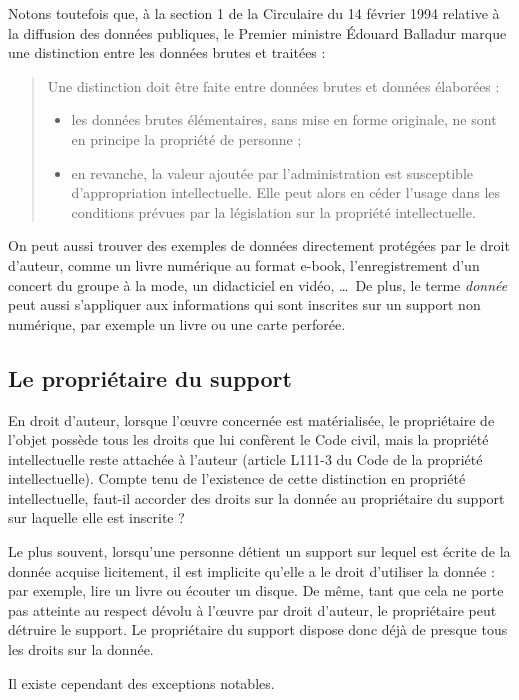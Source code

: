 Notons toutefois que, à la section 1 de la Circulaire du 14 février
1994 relative à la diffusion des données publiques, le Premier
ministre Édouard Balladur marque une distinction entre les données
brutes et traitées :

\begin{quotation}
  Une distinction doit être faite entre données brutes et données
  élaborées :
  \begin{itemize}
  \item les données brutes élémentaires, sans mise en forme
    originale, ne sont en principe la propriété de personne ;
  \item en revanche, la valeur ajoutée par l'administration est
    susceptible d'appropriation intellectuelle. Elle peut alors en
    céder l'usage dans les conditions prévues par la législation sur
    la propriété intellectuelle.
  \end{itemize}
\end{quotation}

On peut aussi trouver des exemples de données directement protégées
par le droit d'auteur, comme un livre numérique au format e-book,
l'enregistrement d'un concert du groupe à la mode, un didacticiel en
vidéo, \dots\ De plus, le terme \emph{donnée} peut aussi s'appliquer
aux informations qui sont inscrites sur un support non numérique, par
exemple un livre ou une carte perforée.

\subsection{Le propriétaire du support}

En droit d'auteur, lorsque l'œuvre concernée est matérialisée, le
propriétaire de l'objet possède tous les droits que lui confèrent le
Code civil, mais la propriété intellectuelle reste attachée à l'auteur
(article L111-3 du Code de la propriété intellectuelle). Compte tenu
de l'existence de cette distinction en propriété intellectuelle,
faut-il accorder des droits sur la donnée au propriétaire du support
sur laquelle elle est inscrite ?

Le plus souvent, lorsqu'une personne détient un support sur lequel est
écrite de la donnée acquise licitement, il est implicite qu'elle a le
droit d'utiliser la donnée : par exemple, lire un livre ou écouter un
disque. De même, tant que cela ne porte pas atteinte au respect dévolu
à l'œuvre par droit d'auteur, le propriétaire peut détruire le
support. Le propriétaire du support dispose donc déjà de presque tous
les droits sur la donnée.

Il existe cependant des exceptions notables.



